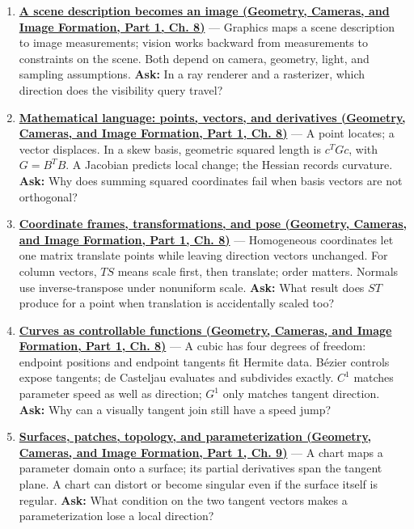 \begin{enumerate}
\def\labelenumi{\arabic{enumi}.}
\item
  \textbf{\href{../03-Geometry-Cameras-and-Image-Formation-P01/main.pdf\#03-visual-computing-i-ch001-a-scene-description-becomes-an-image}{A scene description becomes an image (Geometry, Cameras, and Image Formation, Part 1, Ch. 8)}} --- Graphics maps a scene description to image measurements; vision works backward from measurements to constraints on the scene. Both depend on camera, geometry, light, and sampling assumptions. \textbf{Ask:} In a ray renderer and a rasterizer, which direction does the visibility query travel?
\item
  \textbf{\href{../03-Geometry-Cameras-and-Image-Formation-P01/main.pdf\#03-visual-computing-i-ch001-mathematical-language-points-vectors-and-derivatives}{Mathematical language: points, vectors, and derivatives (Geometry, Cameras, and Image Formation, Part 1, Ch. 8)}} --- A point locates; a vector displaces. In a skew basis, geometric squared length is \(c^T Gc\), with \(G=B^TB\). A Jacobian predicts local change; the Hessian records curvature. \textbf{Ask:} Why does summing squared coordinates fail when basis vectors are not orthogonal?
\item
  \textbf{\href{../03-Geometry-Cameras-and-Image-Formation-P01/main.pdf\#03-visual-computing-i-ch001-coordinate-frames-transformations-and-pose}{Coordinate frames, transformations, and pose (Geometry, Cameras, and Image Formation, Part 1, Ch. 8)}} --- Homogeneous coordinates let one matrix translate points while leaving direction vectors unchanged. For column vectors, \(TS\) means scale first, then translate; order matters. Normals use inverse-transpose under nonuniform scale. \textbf{Ask:} What result does \(ST\) produce for a point when translation is accidentally scaled too?
\item
  \textbf{\href{../03-Geometry-Cameras-and-Image-Formation-P01/main.pdf\#03-visual-computing-i-ch001-curves-as-controllable-functions}{Curves as controllable functions (Geometry, Cameras, and Image Formation, Part 1, Ch. 8)}} --- A cubic has four degrees of freedom: endpoint positions and endpoint tangents fit Hermite data. Bézier controls expose tangents; de Casteljau evaluates and subdivides exactly. \(C^1\) matches parameter speed as well as direction; \(G^1\) only matches tangent direction. \textbf{Ask:} Why can a visually tangent join still have a speed jump?
\item
  \textbf{\href{../03-Geometry-Cameras-and-Image-Formation-P01/main.pdf\#03-visual-computing-i-ch002-surfaces-patches-topology-and-parameterization}{Surfaces, patches, topology, and parameterization (Geometry, Cameras, and Image Formation, Part 1, Ch. 9)}} --- A chart maps a parameter domain onto a surface; its partial derivatives span the tangent plane. A chart can distort or become singular even if the surface itself is regular. \textbf{Ask:} What condition on the two tangent vectors makes a parameterization lose a local direction?

\end{enumerate}
